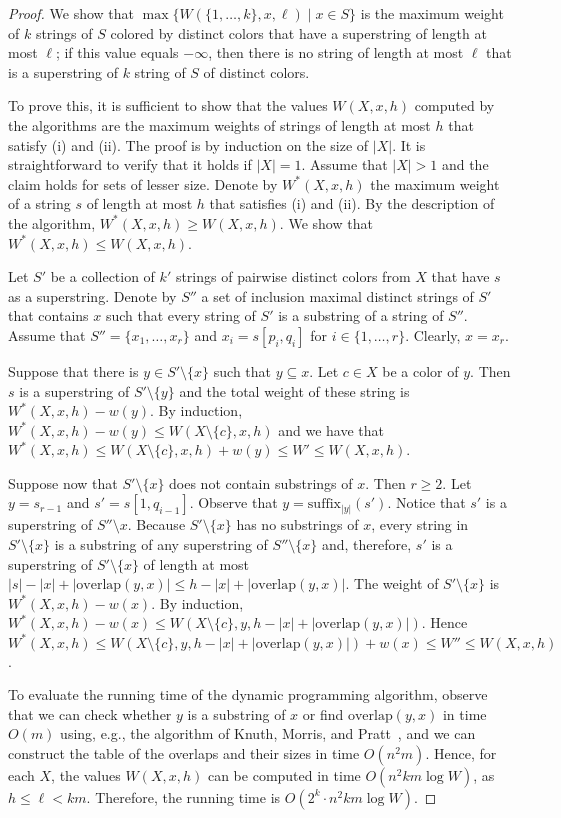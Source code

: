 \documentclass[11pt]{article}
\newcommand{\suffix}{\textrm{suffix}}
\newcommand{\overlap}{\textrm{overlap}}
\begin{document}
\begin{proof}
We show that $\max\{W(\{1,\ldots,k\},x,\ell)\mid x\in S\}$ is the maximum weight  of $k$ strings of $S$ colored by distinct colors that have a superstring of length at most $\ell$; if this value equals $-\infty$, then there is no string of length at most $\ell$ that is a superstring of $k$ string of $S$ of distinct colors.

To prove this, it is sufficient to show that the values $W(X,x,h)$ computed by the algorithms are the maximum weights of strings of length at most $h$ that satisfy (i) and (ii). The proof is by induction on the size of $|X|$. It is straightforward to verify that it holds if $|X|=1$. Assume that $|X|>1$ and the  claim holds for sets of lesser size. 
Denote by  $W^*(X,x,h)$ the maximum weight of a string $s$ of length at most $h$ that satisfies (i) and (ii).  
By the description of the algorithm, $W^*(X,x,h)\geq W(X,x,h)$. We show that  $W^*(X,x,h)\leq W(X,x,h)$. 

Let $S'$ be a collection of $k'$ strings of pairwise distinct colors from $X$ that have $s$ as a superstring. Denote by $S''$ a set of inclusion maximal distinct strings of $S'$ that contains $x$ such that every string of $S'$ is a substring of a string of $S''$. Assume that $S''=\{x_1,\ldots,x_r\}$ and $x_i=s[p_i,q_i]$ for $i\in\{1,\ldots,r\}$.
Clearly, $x=x_r$. 

Suppose that there is $y\in S'\setminus\{x\}$ such that $y\subseteq x$. Let $c\in X$ be a color of $y$. Then $s$ is a superstring of $S'\setminus\{y\}$ and the total weight of these string is $W^*(X,x,h)-w(y)$. By induction, $W^*(X,x,h)-w(y)\leq W(X\setminus\{c\},x,h)$ and we have that $W^*(X,x,h)\leq W(X\setminus\{c\},x,h)+w(y)\leq W'\leq W(X,x,h)$.

Suppose now that $S'\setminus\{x\}$ does not contain substrings of $x$. Then $r\geq 2$. Let $y=s_{r-1}$ and $s'=s[1,q_{i-1}]$.  Observe that $y=\suffix_{|y|}(s')$.
Notice that $s'$ is a superstring of $S''\setminus x$. 
Because $S'\setminus \{x\}$ has no substrings of $x$, every string in $S'\setminus\{x\}$ is a substring of any superstring of $S''\setminus\{x\}$  and, therefore, $s'$ is a superstring of $S'\setminus\{x\}$ of length at most $|s|-|x|+|\overlap(y,x)|\leq h-|x|+|\overlap(y,x)|$.  The weight of $S'\setminus\{x\}$ is $W^*(X,x,h)-w(x)$. By induction, 
$W^*(X,x,h)-w(x)\leq W(X\setminus\{c\},y,h-|x|+|\overlap(y,x)|)$. Hence $W^*(X,x,h)\leq W(X\setminus\{c\},y,h-|x|+|\overlap(y,x)|)+w(x)\leq W''\leq W(X,x,h)$.

To evaluate the running time of the dynamic programming algorithm, observe that we can check whether $y$ is a substring of $x$ or find $\overlap(y,x)$ in time $O(m)$ using, e.g., the algorithm of Knuth, Morris, and Pratt~\cite{KnuthMP77}, 
and we can construct the table of the overlaps and their sizes in time $O(n^2m)$. 
Hence, for each $X$, the values $W(X,x,h)$ can be computed in time $O(n^2 k m\log W)$, as 
$h\leq \ell<km$. 
Therefore, the running time is $O(2^k\cdot n^2 k m\log W)$. 


\end{proof}
\end{document}
